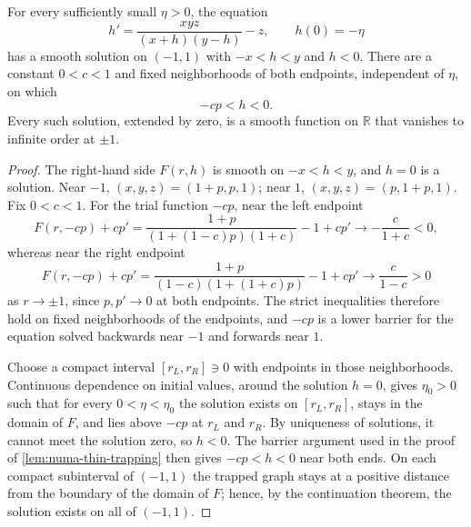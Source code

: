 \begin{lemma}\label{lem:quadratic-density-trapping}
For every sufficiently small $\eta>0$, the equation
\begin{equation}\label{eq:quadratic-density-ode}
 h'=\frac{xyz}{(x+h)(y-h)}-z,\qquad h(0)=-\eta
\end{equation}
has a smooth solution on $(-1,1)$ with $-x<h<y$ and $h<0$. There are a constant $0<c<1$ and fixed neighborhoods of both endpoints, independent of $\eta$, on which
\[
 -cp<h<0.
\]
Every such solution, extended by zero, is a smooth function on $\mathbb R$ that vanishes to infinite order at $\pm1$.
\end{lemma}
\begin{proof}
The right-hand side $F(r,h)$ is smooth on $-x<h<y$, and $h=0$ is a solution. Near $-1$, $(x,y,z)=(1+p,p,1)$; near $1$, $(x,y,z)=(p,1+p,1)$. Fix $0<c<1$. For the trial function $-cp$, near the left endpoint
\[
 F(r,-cp)+cp'
 =\frac{1+p}{(1+(1-c)p)(1+c)}-1+cp'
 \longrightarrow-\frac{c}{1+c}<0,
\]
whereas near the right endpoint
\[
 F(r,-cp)+cp'
 =\frac{1+p}{(1-c)(1+(1+c)p)}-1+cp'
 \longrightarrow\frac{c}{1-c}>0
\]
as $r\to\pm1$, since $p,p'\to0$ at both endpoints. The strict inequalities therefore hold on fixed neighborhoods of the endpoints, and $-cp$ is a lower barrier for the equation solved backwards near $-1$ and forwards near $1$.

Choose a compact interval $[r_L,r_R]\ni0$ with endpoints in those neighborhoods. Continuous dependence on initial values, around the solution $h=0$, gives $\eta_0>0$ such that for every $0<\eta<\eta_0$ the solution exists on $[r_L,r_R]$, stays in the domain of $F$, and lies above $-cp$ at $r_L$ and $r_R$. By uniqueness of solutions, it cannot meet the solution zero, so $h<0$. The barrier argument used in the proof of \cref{lem:numa-thin-trapping} then gives $-cp<h<0$ near both ends. On each compact subinterval of $(-1,1)$ the trapped graph stays at a positive distance from the boundary of the domain of $F$; hence, by the continuation theorem, the solution exists on all of $(-1,1)$.


\end{proof}

